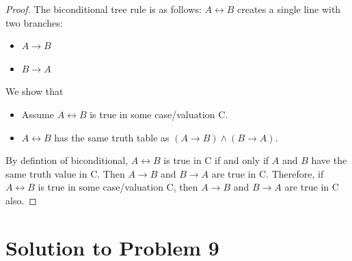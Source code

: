 \documentclass[12pt]{article}
\begin{document}
\begin{proof}

    The biconditional tree rule is as follows:
    $A \leftrightarrow B$ creates a single line with two branches:
    \begin{itemize}
        \item $A \rightarrow B$
        \item $B \rightarrow A$
    \end{itemize}

    We show that

    \begin{itemize}
        \item Assume $A \leftrightarrow B$ is true in some case/valuation C. 
        \item $A \leftrightarrow B$ has the same truth table as $(A \rightarrow B) \land (B \rightarrow A)$.
    \end{itemize}

    By defintion of biconditional, $A \leftrightarrow B$ is true in C if and only if $A$ and $B$ have the same truth value in C.
    Then $A \rightarrow B$ and $B \rightarrow A$ are true in C.
    Therefore, if $A \leftrightarrow B$ is true in some case/valuation C, then $A \rightarrow B$ and $B \rightarrow A$ are true in C also.

\end{proof}



\section*{Solution to Problem 9}
\end{document}
